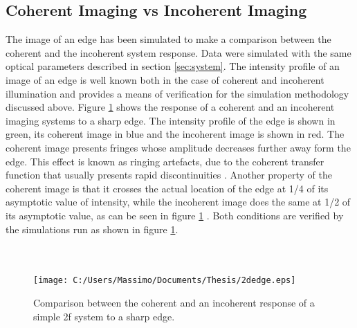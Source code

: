 \subsection{Coherent Imaging vs Incoherent Imaging}
The image of an edge has been simulated to make a comparison between the coherent and the incoherent system response. Data were simulated with the same optical parameters described in section \ref{sec:system}. The intensity profile of an image of an edge is well known both in the case of coherent and incoherent illumination and provides a means of verification for the simulation methodology discussed above. Figure \ref{fig:coherenceprofile} shows the response of a coherent and an incoherent imaging systems to a sharp edge. The intensity profile of the edge is shown in green, its coherent image in blue and the incoherent image is shown in red. The coherent image presents fringes whose amplitude decreases further away form the edge. This effect is known as ringing artefacts, due to the coherent transfer function that usually presents rapid discontinuities \cite{goodman2005introduction}. Another property of the coherent image is that it crosses the actual location of the edge at 1/4 of its asymptotic value of intensity, while the incoherent image does the same at 1/2 of its asymptotic value, as can be seen in figure \ref{fig:coherenceprofile} \cite{goodman2005introduction}. Both conditions are verified by the simulations run as shown in figure \ref{fig:coherenceprofile}. \\
\\
\\
\begin{figure}[H]
	\centering
	\texttt{[image: C:/Users/Massimo/Documents/Thesis/2dedge.eps]}
	\caption{\label{fig:coherenceprofile}Comparison between the coherent and an incoherent response of a simple 2f system to a sharp edge.}
\end{figure}
